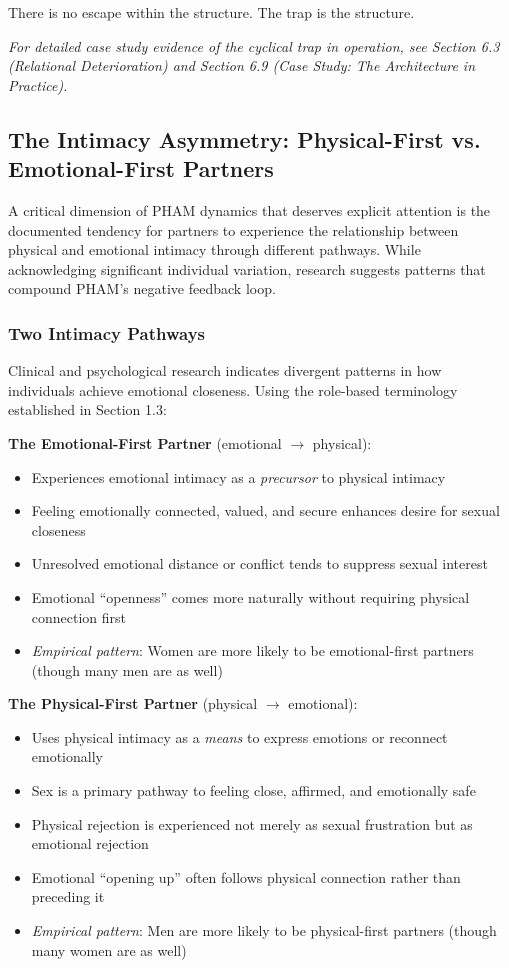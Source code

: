 \documentclass[12pt, letterpaper]{article}
\begin{document}
There is no escape within the structure. The trap is the structure.

\textit{For detailed case study evidence of the cyclical trap in operation, see Section 6.3 (Relational Deterioration) and Section 6.9 (Case Study: The Architecture in Practice).}

\subsection{The Intimacy Asymmetry: Physical-First vs. Emotional-First Partners}

A critical dimension of PHAM dynamics that deserves explicit attention is the documented tendency for partners to experience the relationship between physical and emotional intimacy through different pathways. While acknowledging significant individual variation, research suggests patterns that compound PHAM's negative feedback loop.

\subsubsection{Two Intimacy Pathways}

Clinical and psychological research indicates divergent patterns in how individuals achieve emotional closeness. Using the role-based terminology established in Section 1.3:

\textbf{The Emotional-First Partner} (emotional $\rightarrow$ physical):
\begin{itemize}
    \item Experiences emotional intimacy as a \textit{precursor} to physical intimacy
    \item Feeling emotionally connected, valued, and secure enhances desire for sexual closeness
    \item Unresolved emotional distance or conflict tends to suppress sexual interest
    \item Emotional ``openness'' comes more naturally without requiring physical connection first
    \item \textit{Empirical pattern}: Women are more likely to be emotional-first partners (though many men are as well)
\end{itemize}

\textbf{The Physical-First Partner} (physical $\rightarrow$ emotional):
\begin{itemize}
    \item Uses physical intimacy as a \textit{means} to express emotions or reconnect emotionally
    \item Sex is a primary pathway to feeling close, affirmed, and emotionally safe
    \item Physical rejection is experienced not merely as sexual frustration but as emotional rejection
    \item Emotional ``opening up'' often follows physical connection rather than preceding it
    \item \textit{Empirical pattern}: Men are more likely to be physical-first partners (though many women are as well)
\end{itemize}
\end{document}
